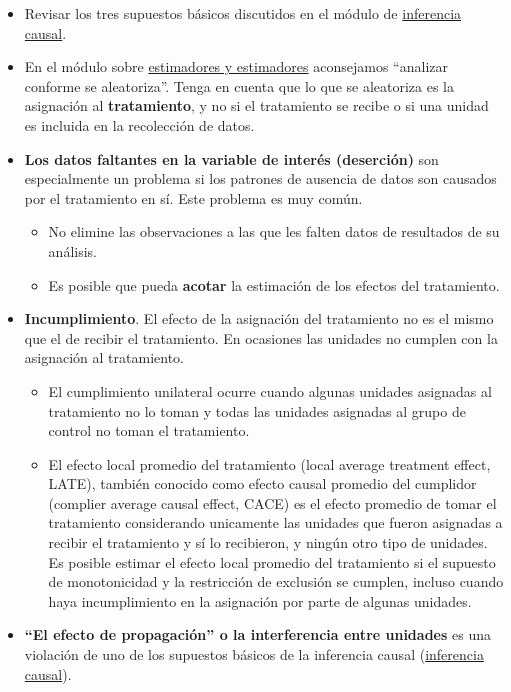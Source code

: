 \documentclass[
  12pt,
  spanish,
]{book}
\begin{document}
\begin{itemize}
\item
  Revisar los tres supuestos básicos discutidos en el módulo de \href{inferencia-causal.html}{inferencia causal}.
\item
  En el módulo sobre \href{estimandos-y-estimadores.html}{estimadores y estimadores} aconsejamos ``analizar conforme se aleatoriza''. Tenga en cuenta que lo que se aleatoriza es la asignación al \textbf{tratamiento}, y no si el tratamiento se recibe o si una unidad es incluida en la recolección de datos.
\item
  \textbf{Los datos faltantes en la variable de interés (deserción)} son especialmente un problema si los patrones de ausencia de datos son causados por el tratamiento en sí. Este problema es muy común.

  \begin{itemize}
  \item
    No elimine las observaciones a las que les falten datos de resultados de su análisis.
  \item
    Es posible que pueda \textbf{acotar} la estimación de los efectos del tratamiento.
  \end{itemize}
\item
  \textbf{Incumplimiento}. El efecto de la asignación del tratamiento no es el mismo que el de recibir el tratamiento. En ocasiones las unidades no cumplen con la asignación al tratamiento.

  \begin{itemize}
  \item
    El cumplimiento unilateral ocurre cuando algunas unidades asignadas al tratamiento no lo toman y todas las unidades asignadas al grupo de control no toman el tratamiento.
  \item
    El efecto local promedio del tratamiento (local average treatment effect, LATE), también conocido como efecto causal promedio del cumplidor (complier average causal effect, CACE) es el efecto promedio de tomar el tratamiento considerando unicamente las unidades que fueron asignadas a recibir el tratamiento y sí lo recibieron, y ningún otro tipo de unidades. Es posible estimar el efecto local promedio del tratamiento si el supuesto de monotonicidad y la restricción de exclusión se cumplen, incluso cuando haya incumplimiento en la asignación por parte de algunas unidades.
  \end{itemize}
\item
  \textbf{``El efecto de propagación'' o la interferencia entre unidades} es una violación de uno de los supuestos básicos de la inferencia causal (\href{causalinference.html}{inferencia causal}).


\end{itemize}
\end{document}
